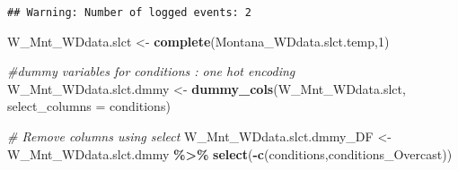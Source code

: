 \documentclass[
]{article}
\newenvironment{Shaded}{\begin{snugshade}}{\end{snugshade}}
\newcommand{\AttributeTok}[1]{\textcolor[rgb]{0.13,0.29,0.53}{#1}}
\newcommand{\CommentTok}[1]{\textcolor[rgb]{0.56,0.35,0.01}{\textit{#1}}}
\newcommand{\DecValTok}[1]{\textcolor[rgb]{0.00,0.00,0.81}{#1}}
\newcommand{\FunctionTok}[1]{\textcolor[rgb]{0.13,0.29,0.53}{\textbf{#1}}}
\newcommand{\NormalTok}[1]{#1}
\newcommand{\OtherTok}[1]{\textcolor[rgb]{0.56,0.35,0.01}{#1}}
\newcommand{\SpecialCharTok}[1]{\textcolor[rgb]{0.81,0.36,0.00}{\textbf{#1}}}
\newcommand{\StringTok}[1]{\textcolor[rgb]{0.31,0.60,0.02}{#1}}
\begin{document}
\begin{verbatim}
## Warning: Number of logged events: 2
\end{verbatim}

\begin{Shaded}
\begin{Highlighting}[]
\NormalTok{W\_Mnt\_WDdata.slct }\OtherTok{\textless{}{-}} \FunctionTok{complete}\NormalTok{(Montana\_WDdata.slct.temp,}\DecValTok{1}\NormalTok{)}

\CommentTok{\#dummy variables for conditions : one hot encoding}
\NormalTok{W\_Mnt\_WDdata.slct.dmmy }\OtherTok{\textless{}{-}} \FunctionTok{dummy\_cols}\NormalTok{(W\_Mnt\_WDdata.slct, }
                                         \AttributeTok{select\_columns =} \StringTok{\textquotesingle{}conditions\textquotesingle{}}\NormalTok{)}

\CommentTok{\# Remove columns using select}
\NormalTok{W\_Mnt\_WDdata.slct.dmmy\_DF }\OtherTok{\textless{}{-}}\NormalTok{ W\_Mnt\_WDdata.slct.dmmy }\SpecialCharTok{\%\textgreater{}\%} \FunctionTok{select}\NormalTok{(}\SpecialCharTok{{-}}\FunctionTok{c}\NormalTok{(conditions,conditions\_Overcast))}


\end{Highlighting}
\end{Shaded}
\end{document}
